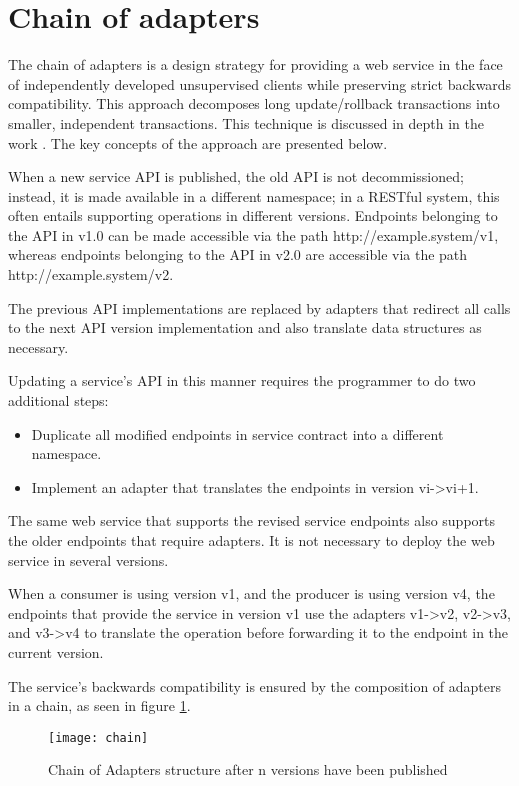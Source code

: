 \section{Chain of adapters} %
\label{sec:chain_of_adapters}

The chain of adapters is a design strategy for providing a web service in the face of independently developed unsupervised clients while preserving strict backwards compatibility.
This approach decomposes long update/rollback transactions into smaller, independent transactions.
This technique is discussed in depth in the work \cite{13}. The key concepts of the approach are presented below.

When a new service API is published, the old API is not decommissioned;
instead, it is made available in a different namespace;
in a RESTful system, this often entails supporting operations in different versions.
Endpoints belonging to the API in v1.0 can be made accessible via the path http://example.system/v1,
whereas endpoints belonging to the API in v2.0 are accessible via the path http://example.system/v2.

The previous API implementations are replaced by adapters that redirect all calls to the next API version implementation and also translate data structures as necessary.

Updating a service's API in this manner requires the programmer to do two additional steps:
\begin{itemize}
    \item Duplicate all modified endpoints in service contract into a different namespace.
    \item Implement an adapter that translates the endpoints in version vi->vi+1.
\end{itemize}

The same web service that supports the revised service endpoints also supports the older endpoints that require adapters.
It is not necessary to deploy the web service in several versions.

When a consumer is using version v1, and the producer is using version v4, the endpoints that provide the service in version v1 use the adapters v1->v2, v2->v3, and v3->v4 to translate the operation before forwarding it to the endpoint in the current version.

The service's backwards compatibility is ensured by the composition of adapters in a chain, as seen in figure \ref{fig:chain}.

\begin{figure}[htbp]
    \centering
    \texttt{[image: chain]}
    \caption{Chain of Adapters structure
    after n versions have been published }
    \label{fig:chain}
\end{figure}

